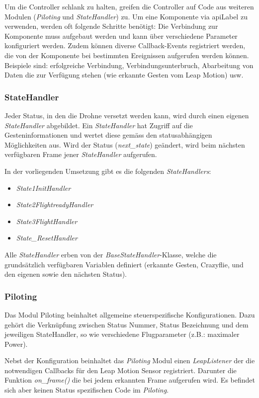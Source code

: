 Um die Controller schlank zu halten, greifen die Controller auf Code aus weiteren Modulen (\textit{Piloting} und \textit{StateHandler}) zu.
Um eine Komponente via \gls{apiLabel} zu verwenden, werden oft folgende Schritte benötigt:
Die Verbindung zur Komponente muss aufgebaut werden und kann über verschiedene Parameter konfiguriert werden.
Zudem können diverse Callback-Events registriert werden, die von der Komponente bei bestimmten Ereignissen aufgerufen werden können. Beispiele sind: erfolgreiche Verbindung, Verbindungsunterbruch, Abarbeitung von Daten die zur Verfügung stehen (wie erkannte Gesten vom Leap Motion) usw.

\subsubsection{StateHandler}
Jeder Status, in den die Drohne versetzt werden kann, wird durch einen eigenen \textit{StateHandler} abgebildet.
Ein \textit{StateHandler} hat Zugriff auf die Gesteninformationen und wertet diese gemäss den statusabhängigen Möglichkeiten aus.
Wird der Status (\textit{next\_state}) geändert, wird beim nächsten verfügbaren Frame jener \textit{StateHandler} aufgerufen.

In der vorliegenden Umsetzung gibt es die folgenden \textit{StateHandlers}:
\begin{itemize}
	\item \textit{State1InitHandler}
	\item \textit{State2FlightreadyHandler}
	\item \textit{State3FlightHandler}
	\item \textit{State\_ResetHandler}
\end{itemize}
Alle \textit{StateHandler} erben von der \textit{BaseStateHandler}-Klasse, welche die grundsätzlich verfügbaren Variablen definiert (erkannte Gesten, Crazyflie, und den eigenen sowie den nächsten Status).

\subsubsection{Piloting}
Das Modul Piloting beinhaltet allgemeine steuerspezifische Konfigurationen.
Dazu gehört die Verknüpfung zwischen Status Nummer, Status Bezeichnung und dem jeweiligen StateHandler, so wie verschiedene Flugparameter (z.B.: maximaler Power).

Nebst der Konfiguration beinhaltet das \textit{Piloting} Modul einen \textit{LeapListener} der die notwendigen Callbacks für den Leap Motion Sensor registriert. Darunter die Funktion \textit{on\_frame()} die bei jedem erkannten Frame aufgerufen wird.
Es befindet sich aber keinen Status spezifischen Code im \textit{Piloting}.

